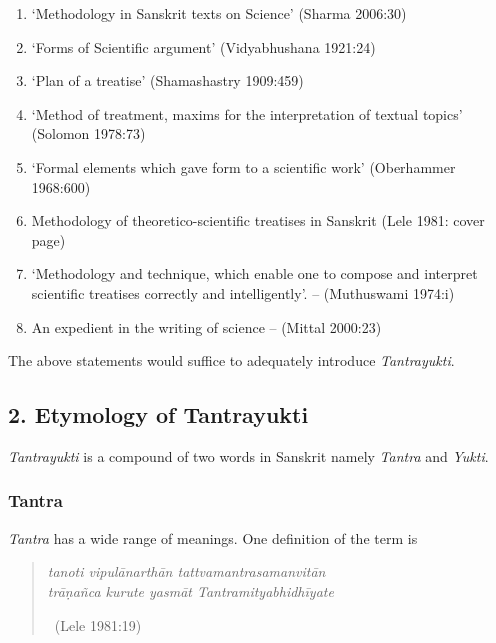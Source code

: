 \begin{enumerate}[{\rm i)}]
\itemsep=0pt
\item ‘Methodology in Sanskrit texts on Science’ (Sharma 2006:30)

 \item ‘Forms of Scientific argument’ (Vidyabhushana 1921:24) 

 \item ‘Plan of a treatise’ (Shamashastry 1909:459)

 \item ‘Method of treatment, maxims for the interpretation of textual topics’ (Solomon 1978:73) 

 \item ‘Formal elements which gave form to a scientific work’ (Oberhammer 1968:600)

 \item Methodology of theoretico-scientific treatises in Sanskrit (Lele 1981: cover page)

 \item ‘Methodology and technique, which enable one to compose and interpret scientific treatises correctly and intelligently’. – (Muthuswami 1974:i)

 \item An expedient in the writing of science – (Mittal 2000:23)

\end{enumerate}

The above statements would suffice to adequately introduce \textit{Tantra\-yukti}.


\subsection*{2. Etymology of Tantrayukti}

\vskip -6pt

\textit{Tantrayukti} is a compound of two words in Sanskrit namely \textit{Tantra} and \textit{Yukti}.

\subsubsection*{Tantra}

\vskip -5pt

\textit{Tantra} has a wide range of meanings. One definition of the term is

\vskip -6pt

\begin{verse}
\textit{tanoti vipulānarthān tattvamantrasamanvitān }\\\textit{ trāṇañca kurute yasmāt Tantramityabhidhīyate }

~\hfill (Lele 1981:19)
\end{verse}

